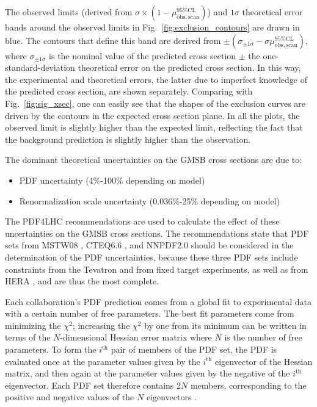 \documentclass[dissertation.tex]{subfiles}
\begin{document}
The observed limits (derived from $\sigma\times(1 - \mu_{\mathrm{obs,scan}}^{95\%\mathrm{CL}})$) and $1\sigma$ theoretical error bands around the observed limits in Fig.~\ref{fig:exclusion_contours} are drawn in blue.  The contours that define this band are derived from $\pm(\sigma_{\pm1\sigma} - \sigma\mu_{\mathrm{obs,scan}}^{95\%\mathrm{CL}})$, where $\sigma_{\pm1\sigma}$ is the nominal value of the predicted cross section $\pm$ the one-standard-deviation theoretical error on the predicted cross section.  In this way, the experimental and theoretical errors, the latter due to imperfect knowledge of the predicted cross section, are shown separately.  Comparing with Fig.~\ref{fig:sig_xsec}, one can easily see that the shapes of the exclusion curves are driven by the contours in the expected cross section plane.  In all the plots, the observed limit is slightly higher than the expected limit, reflecting the fact that the background prediction is slightly higher than the observation.

The dominant theoretical uncertainties on the GMSB cross sections are due to:

\begin{itemize}
\item PDF uncertainty (4\%-100\% depending on model)
\item Renormalization scale uncertainty (0.036\%-25\% depending on model)
\end{itemize}
%
The PDF4LHC \cite{PDF4LHC1,PDF4LHC2,PDF4LHC3} recommendations are used to calculate the effect of these uncertainties on the GMSB cross sections.  The recommendations state that PDF sets from MSTW08 \cite{springerlink:10.1140/epjc/s10052-009-1072-5}, CTEQ6.6 \cite{PhysRevD.78.013004}, and NNPDF2.0 \cite{Ball2010136} should be considered in the determination of the PDF uncertainties, because these three PDF sets include constraints from the Tevatron and from fixed target experiments, as well as from HERA \cite{HERA}, and are thus the most complete.

Each collaboration's PDF prediction comes from a global fit to experimental data with a certain number of free parameters.  The best fit parameters come from minimizing the $\chi^{2}$; increasing the $\chi^{2}$ by one from its minimum can be written in terms of the $N$-dimensional Hessian error matrix \cite{Hessian} where $N$ is the number of free parameters.  To form the $i^{\mathrm{th}}$ pair of members of the PDF set, the PDF is evaluated once at the parameter values given by the $i^{\mathrm{th}}$ eigenvector of the Hessian matrix, and then again at the parameter values given by the negative of the $i^{\mathrm{th}}$ eigenvector.  Each PDF set therefore contains 2$N$ members, corresponding to the positive and negative values of the $N$ eigenvectors \cite{0034-4885-70-1-R02}.
\end{document}
